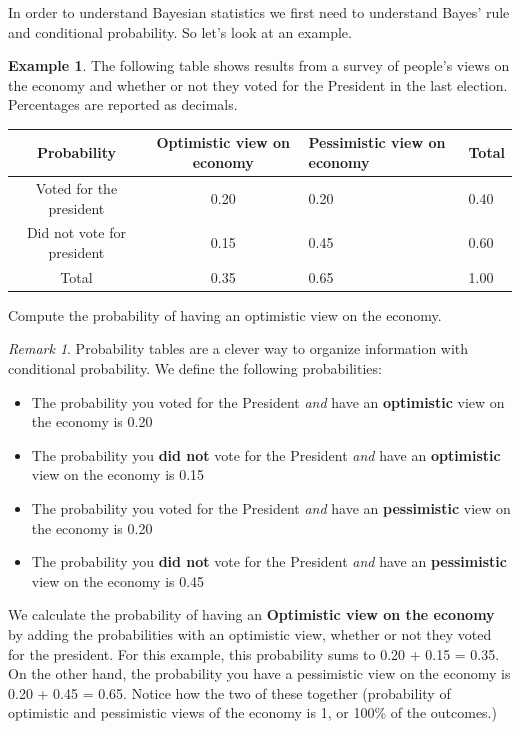 \documentclass[
]{book}
\providecommand{\tightlist}{%
  \setlength{\itemsep}{0pt}\setlength{\parskip}{0pt}}
\theoremstyle{definition}
\theoremstyle{definition}
\newtheorem{example}{Example}[chapter]
\theoremstyle{definition}
\theoremstyle{remark}
\newtheorem*{remark}{Remark}
\begin{document}
In order to understand Bayesian statistics we first need to understand Bayes' rule and conditional probability. So let's look at an example.

\begin{example}
\protect\hypertarget{exm:president-pop}{}{\label{exm:president-pop} }The following table shows results from a survey of people's views on the economy and whether or not they voted for the President in the last election. Percentages are reported as decimals.

\begin{longtable}[]{@{}ccll@{}}
\toprule
Probability & Optimistic view on economy & Pessimistic view on economy & Total \\
\midrule
\endhead
Voted for the president & 0.20 & 0.20 & 0.40 \\
Did not vote for president & 0.15 & 0.45 & 0.60 \\
Total & 0.35 & 0.65 & 1.00 \\
\bottomrule
\end{longtable}

Compute the probability of having an optimistic view on the economy.
\end{example}

\begin{remark}
{}Probability tables are a clever way to organize information with conditional probability. We define the following probabilities:

\begin{itemize}
\tightlist
\item
  The probability you voted for the President \emph{and} have an \textbf{optimistic} view on the economy is 0.20
\item
  The probability you \textbf{did not} vote for the President \emph{and} have an \textbf{optimistic} view on the economy is 0.15
\item
  The probability you voted for the President \emph{and} have an \textbf{pessimistic} view on the economy is 0.20
\item
  The probability you \textbf{did not} vote for the President \emph{and} have an \textbf{pessimistic} view on the economy is 0.45
\end{itemize}

We calculate the probability of having an \textbf{Optimistic view on the economy} by adding the probabilities with an optimistic view, whether or not they voted for the president. For this example, this probability sums to 0.20 + 0.15 = 0.35. On the other hand, the probability you have a pessimistic view on the economy is 0.20 + 0.45 = 0.65. Notice how the two of these together (probability of optimistic and pessimistic views of the economy is 1, or 100\% of the outcomes.)
\end{remark}
\end{document}
